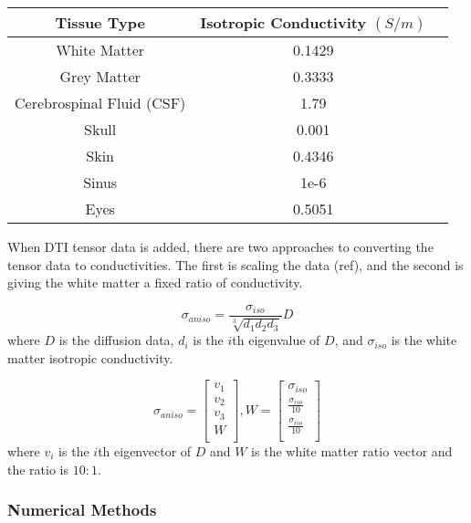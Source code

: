\begin{center}
\begin{tabular}{ |c|c|c| } 
 \hline
Tissue Type & Isotropic Conductivity $(S/m)$\\ 
 \hline
 \hline
 White Matter & 0.1429\\ 
 \hline
 Grey Matter & 0.3333 \\ 
 \hline
 Cerebrospinal Fluid (CSF) & 1.79\\
 \hline
Skull & 0.001\\
 \hline
 Skin & 0.4346\\
 \hline
 Sinus & 1e-6\\
 \hline
 Eyes & 0.5051\\
 \hline
\end{tabular}
\end{center}

When DTI tensor data is added, there are two approaches to converting the tensor data to conductivities. The first is scaling the data (ref), and the second is giving the white matter a fixed ratio of conductivity. 

\begin{equation}
\sigma_{aniso} = \frac{\sigma_{iso}}{\sqrt[3]{d_1d_2d_3}}D
\end{equation}
where $D$ is the diffusion data, $d_i$ is the $i$th eigenvalue of $D$, and $\sigma_{iso}$ is the white matter isotropic conductivity.

\begin{equation}
\sigma_{aniso} = \begin{bmatrix}
v_1\\
v_2\\
v_3\\
W\\
\end{bmatrix}, 
W = \begin{bmatrix}
\sigma_{iso}\\
\frac{\sigma_{iso}}{10}\\
\frac{\sigma_{iso}}{10}\\
\end{bmatrix}
\end{equation}
where $v_i$ is the $i$th eigenvector of $D$ and $W$ is the white matter ratio vector and the ratio is $10:1$.

\subsubsection{Numerical Methods}
\label{sec:numerical}

